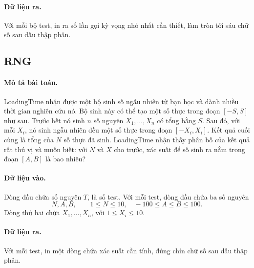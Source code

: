 \documentclass[11pt]{article}
\begin{document}
\paragraph{Dữ liệu ra.}
Với mỗi bộ test, in ra số lần gọi kỳ vọng nhỏ nhất cần thiết, làm tròn tới sáu
chữ số sau dấu thập phân.

\subsection*{RNG}

\paragraph{Mô tả bài toán.}
LoadingTime nhận được một bộ sinh số ngẫu nhiên từ bạn học và dành nhiều thời
gian nghiên cứu nó. Bộ sinh này có thể tạo một số thực trong đoạn \([-S,S]\)
như sau. Trước hết nó sinh \(n\) số nguyên \(X_1,\ldots,X_n\) có tổng bằng
\(S\). Sau đó, với mỗi \(X_i\), nó sinh ngẫu nhiên đều một số thực trong đoạn
\([-X_i,X_i]\). Kết quả cuối cùng là tổng của \(N\) số thực đã sinh. LoadingTime
nhận thấy phân bố của kết quả rất thú vị và muốn biết: với \(N\) và \(X\) cho
trước, xác suất để số sinh ra nằm trong đoạn \([A,B]\) là bao nhiêu?

\paragraph{Dữ liệu vào.}
Dòng đầu chứa số nguyên \(T\), là số test. Với mỗi test, dòng đầu chứa ba số
nguyên
\[
  N,A,B,\qquad 1\le N\le 10,\quad -100\le A\le B\le 100.
\]
Dòng thứ hai chứa \(X_1,\ldots,X_n\), với \(1\le X_i\le 10\).

\paragraph{Dữ liệu ra.}
Với mỗi test, in một dòng chứa xác suất cần tính, đúng chín chữ số sau dấu
thập phân.
\end{document}
